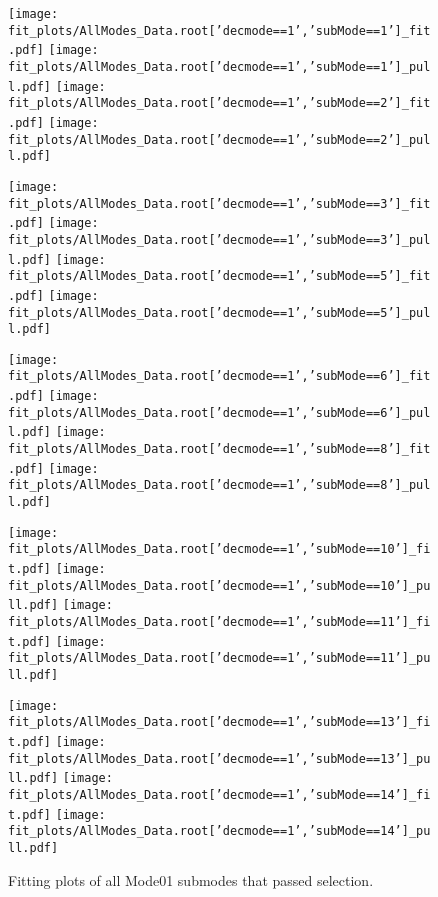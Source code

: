 \begin{figure}[h!]
\begin{center}
\texttt{[image: fit\_plots/AllModes\_Data.root['decmode==1','subMode==1']\_fit.pdf]}
\texttt{[image: fit\_plots/AllModes\_Data.root['decmode==1','subMode==1']\_pull.pdf]}
\texttt{[image: fit\_plots/AllModes\_Data.root['decmode==1','subMode==2']\_fit.pdf]}
\texttt{[image: fit\_plots/AllModes\_Data.root['decmode==1','subMode==2']\_pull.pdf]}

\texttt{[image: fit\_plots/AllModes\_Data.root['decmode==1','subMode==3']\_fit.pdf]}
\texttt{[image: fit\_plots/AllModes\_Data.root['decmode==1','subMode==3']\_pull.pdf]}
\texttt{[image: fit\_plots/AllModes\_Data.root['decmode==1','subMode==5']\_fit.pdf]}
\texttt{[image: fit\_plots/AllModes\_Data.root['decmode==1','subMode==5']\_pull.pdf]}

\texttt{[image: fit\_plots/AllModes\_Data.root['decmode==1','subMode==6']\_fit.pdf]}
\texttt{[image: fit\_plots/AllModes\_Data.root['decmode==1','subMode==6']\_pull.pdf]}
\texttt{[image: fit\_plots/AllModes\_Data.root['decmode==1','subMode==8']\_fit.pdf]}
\texttt{[image: fit\_plots/AllModes\_Data.root['decmode==1','subMode==8']\_pull.pdf]}

\texttt{[image: fit\_plots/AllModes\_Data.root['decmode==1','subMode==10']\_fit.pdf]}
\texttt{[image: fit\_plots/AllModes\_Data.root['decmode==1','subMode==10']\_pull.pdf]}
\texttt{[image: fit\_plots/AllModes\_Data.root['decmode==1','subMode==11']\_fit.pdf]}
\texttt{[image: fit\_plots/AllModes\_Data.root['decmode==1','subMode==11']\_pull.pdf]}

\texttt{[image: fit\_plots/AllModes\_Data.root['decmode==1','subMode==13']\_fit.pdf]}
\texttt{[image: fit\_plots/AllModes\_Data.root['decmode==1','subMode==13']\_pull.pdf]}
\texttt{[image: fit\_plots/AllModes\_Data.root['decmode==1','subMode==14']\_fit.pdf]}
\texttt{[image: fit\_plots/AllModes\_Data.root['decmode==1','subMode==14']\_pull.pdf]}
\caption{Fitting plots of all Mode01 submodes that passed selection.}
\label{fig:passMode01}
\end{center}
\end{figure}
